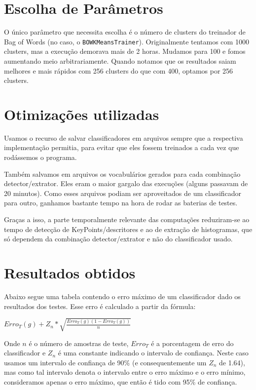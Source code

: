 \documentclass[a4paper,11pt]{article}
\begin{document}

\section{Escolha de Parâmetros}

  O único parâmetro que necessita escolha é o número de clusters do treinador de
  Bag of Words (no caso, o \verb$BOWKMeansTrainer$). Originalmente tentamos com
  1000 clusters, mas a execução demorava mais de 2 horas. Mudamos para 100 e
  fomos aumentando meio arbitrariamente. Quando notamos que os resultados saiam
  melhores e mais rápidos com 256 clusters do que com 400, optamos por 256
  clusters.

\section{Otimizações utilizadas}

  Usamos o recurso de salvar classificadores em arquivos sempre que a respectiva
  implementação permitia, para evitar que eles fossem treinados a cada vez que
  rodássemos o programa.

  Também salvamos em arquivos os vocabulários gerados para cada combinação
  detector/extrator. Eles eram o maior gargalo das execuções (alguns passavam de
  20 minutos). Como esses arquivos podiam ser aproveitados de um classificador
  para outro, ganhamos bastante tempo na hora de rodar as baterias de testes.

  Graças a isso, a parte temporalmente relevante das computações reduziram-se ao
  tempo de detecção de KeyPoints/descritores e ao de extração de histogramas,
  que só dependem da combinação detector/extrator e não do classificador usado.

\section{Resultados obtidos}

  Abaixo segue uma tabela contendo o erro máximo de um classificador dado os
  resultados dos testes. Esse erro é calculado a partir da fórmula:

  \begin{center}
    $ Erro_T(g)+Z_n * \sqrt{\frac{Erro_T(g)(1 - Erro_T(g))}{n}} $
  \end{center}

  Onde $n$ é o número de amostras de teste, $Erro_T$ é a porcentagem de erro do
  classificador e $Z_n$ é uma constante indicando o intervalo de confiança.
  Neste caso usamos um intervalo de confiança de 90\% (e consequentemente um
  $Z_n$ de 1.64), mas como tal intervalo denota o intervalo entre o erro máximo
  e o erro mínimo, consideramos apenas o erro máximo, que então é tido com 95\%
  de confiança.
\end{document}
